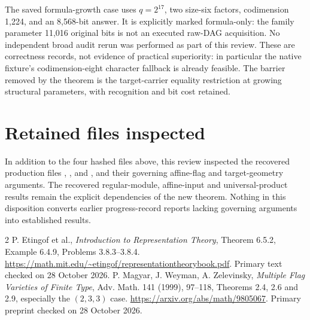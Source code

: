 \documentclass[11pt]{article}
\begin{document}
The saved formula-growth case uses $q=2^{17}$, two size-six factors,
codimension 1,224, and an 8,568-bit answer. It is explicitly marked
formula-only: the family parameter 11,016 original bits is not an
executed raw-DAG acquisition. No independent broad audit rerun was
performed as part of this review. These are correctness records, not
evidence of practical superiority: in particular the native fixture's
codimension-eight character fallback is already feasible. The barrier
removed by the theorem is the target-carrier equality restriction at
growing structural parameters, with recognition and bit cost retained.

\section*{Retained files inspected}
In addition to the four hashed files above, this review inspected the
recovered production files
,
, and
, and their
governing affine-flag and target-geometry arguments. The recovered
regular-module, affine-input and universal-product results remain the
explicit dependencies of the new theorem. Nothing in this disposition
converts earlier progress-record reports lacking governing arguments
into established results.

\begin{thebibliography}{2}
 P. Etingof et al., \emph{Introduction to Representation
Theory}, Theorem 6.5.2, Example 6.4.9, Problems 3.8.3--3.8.4.
\url{https://math.mit.edu/~etingof/representationtheorybook.pdf}.
Primary text checked on 28 October 2026.
 P. Magyar, J. Weyman, A. Zelevinsky,
\emph{Multiple Flag Varieties of Finite Type}, Adv. Math. 141 (1999),
97--118, Theorems 2.4, 2.6 and 2.9, especially the $(2,3,3)$ case.
\url{https://arxiv.org/abs/math/9805067}.
Primary preprint checked on 28 October 2026.
\end{thebibliography}
\end{document}
